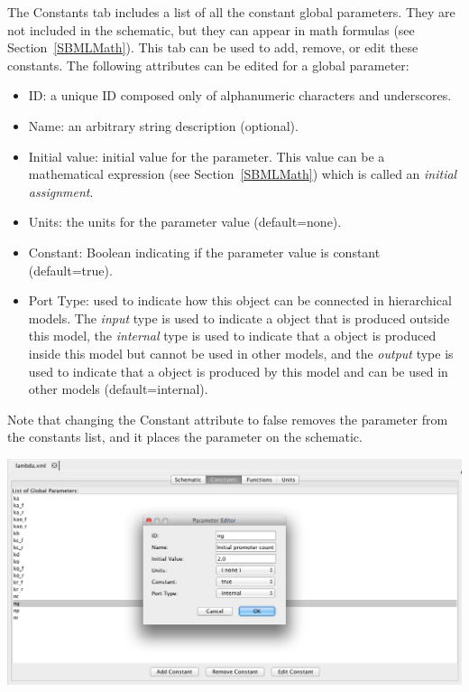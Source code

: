 \documentclass[titlepage,11pt]{article}
\begin{document}
\noindent
The Constants tab includes a list of all the constant global parameters.  They are not included in the schematic, but they can appear in math formulas (see Section~\ref{SBMLMath}).  This tab can be used to add, remove, or edit these constants.  The following attributes can be edited for a global parameter:
\begin{itemize}
\item ID: a unique ID composed only of alphanumeric characters and underscores.
\item Name: an arbitrary string description (optional).
\item Initial value: initial value for the parameter.  This value can be a mathematical expression (see Section~\ref{SBMLMath}) which is called an \emph{initial assignment}.
\item Units: the units for the parameter value (default=none).
\item Constant: Boolean indicating if the parameter value is constant (default=true).
\item Port Type: used to indicate how this object can be connected in hierarchical models.  The \emph{input} type is used to indicate a object that is produced outside this model, the \emph{internal} type is used to indicate that a object is produced inside this model but cannot be used in other models, and the \emph{output} type is used to indicate that a object is produced by this model and can be used in other models (default=internal). 
\end{itemize}
Note that changing the Constant attribute to false removes the parameter from the constants list, and it places the parameter on the schematic.

\begin{center}
\includegraphics[width=160mm]{screenshots/GCMparam}
\end{center}
\end{document}
